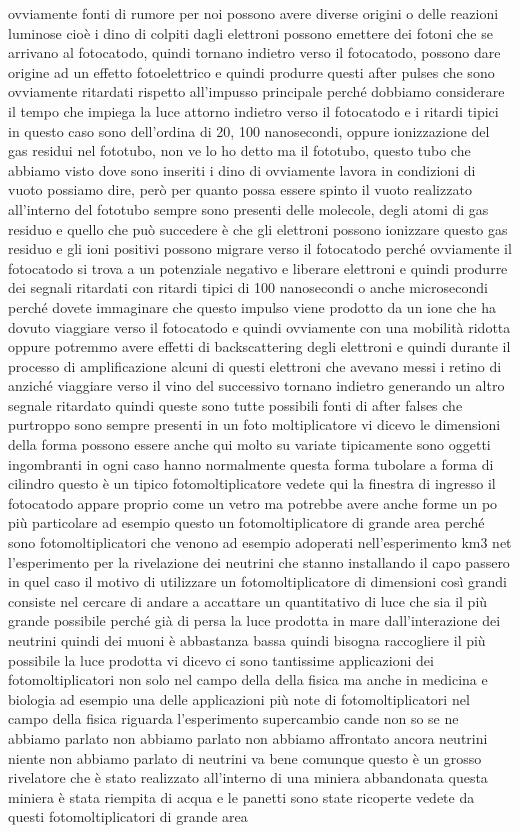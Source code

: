 ovviamente fonti di rumore per noi possono avere diverse origini o delle reazioni luminose cioè i dino di colpiti dagli elettroni possono emettere dei fotoni che se arrivano al fotocatodo, quindi tornano indietro verso il fotocatodo, possono dare origine ad un effetto fotoelettrico e quindi produrre questi after pulses che sono ovviamente ritardati rispetto all'impusso principale perché dobbiamo considerare il tempo che impiega la luce attorno indietro verso il fotocatodo e i ritardi tipici in questo caso sono dell'ordina di 20, 100 nanosecondi, oppure ionizzazione del gas residui nel fototubo, non ve lo ho detto ma il fototubo, questo tubo che abbiamo visto dove sono inseriti i dino di ovviamente lavora in condizioni di vuoto possiamo dire, però per quanto possa essere spinto il vuoto realizzato all'interno del fototubo sempre sono presenti delle molecole, degli atomi di gas residuo e quello che può succedere è che gli elettroni possono ionizzare questo gas residuo e gli ioni positivi possono migrare verso il fotocatodo perché ovviamente il fotocatodo si trova a un potenziale negativo e liberare elettroni e quindi produrre dei segnali ritardati con ritardi tipici di 100 nanosecondi o anche microsecondi perché dovete immaginare che questo impulso viene prodotto da un ione che ha dovuto viaggiare verso il fotocatodo e quindi ovviamente con una mobilità ridotta oppure potremmo avere effetti di backscattering degli elettroni e quindi durante il processo di amplificazione alcuni di questi elettroni che avevano messi i retino di anziché viaggiare verso il vino del successivo tornano indietro generando un altro segnale ritardato quindi queste sono tutte possibili fonti di after falses che purtroppo sono sempre presenti in un foto moltiplicatore vi dicevo le dimensioni della forma possono essere anche qui molto su variate tipicamente sono oggetti ingombranti in ogni caso hanno normalmente questa forma tubolare a forma di cilindro questo è un tipico fotomoltiplicatore vedete qui la finestra di ingresso il fotocatodo appare proprio come un vetro ma potrebbe avere anche forme un po più particolare ad esempio questo un fotomoltiplicatore di grande area perché sono fotomoltiplicatori che venono ad esempio adoperati nell'esperimento km3 net l'esperimento per la rivelazione dei neutrini che stanno installando il capo passero in quel caso il motivo di utilizzare un fotomoltiplicatore di dimensioni così grandi consiste nel cercare di andare a accattare un quantitativo di luce che sia il più grande possibile perché già di persa la luce prodotta in mare dall'interazione dei neutrini quindi dei muoni è abbastanza bassa quindi bisogna raccogliere il più possibile la luce prodotta vi dicevo ci sono tantissime applicazioni dei fotomoltiplicatori non solo nel campo della della fisica ma anche in medicina e biologia ad esempio una delle applicazioni più note di fotomoltiplicatori nel campo della fisica riguarda l'esperimento supercambio cande non so se ne abbiamo parlato non abbiamo parlato non abbiamo affrontato ancora neutrini niente non abbiamo parlato di neutrini va bene comunque questo è un grosso rivelatore che è stato realizzato all'interno di una miniera abbandonata questa miniera è stata riempita di acqua e le panetti sono state ricoperte vedete da questi fotomoltiplicatori di grande area 